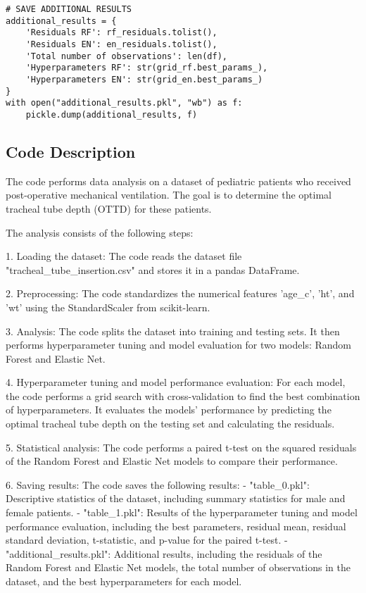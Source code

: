 \documentclass[11pt]{article}
\begin{document}
\begin{verbatim}
# SAVE ADDITIONAL RESULTS
additional_results = {
    'Residuals RF': rf_residuals.tolist(),
    'Residuals EN': en_residuals.tolist(),
    'Total number of observations': len(df),
    'Hyperparameters RF': str(grid_rf.best_params_),
    'Hyperparameters EN': str(grid_en.best_params_)
}
with open("additional_results.pkl", "wb") as f:
    pickle.dump(additional_results, f)

\end{verbatim}

\subsection{Code Description}

The code performs data analysis on a dataset of pediatric patients who received post-operative mechanical ventilation. The goal is to determine the optimal tracheal tube depth (OTTD) for these patients. 

The analysis consists of the following steps:

1. Loading the dataset: The code reads the dataset file "tracheal\_tube\_insertion.csv" and stores it in a pandas DataFrame.

2. Preprocessing: The code standardizes the numerical features 'age\_c', 'ht', and 'wt' using the StandardScaler from scikit-learn.

3. Analysis: The code splits the dataset into training and testing sets. It then performs hyperparameter tuning and model evaluation for two models: Random Forest and Elastic Net.

4. Hyperparameter tuning and model performance evaluation: For each model, the code performs a grid search with cross-validation to find the best combination of hyperparameters. It evaluates the models' performance by predicting the optimal tracheal tube depth on the testing set and calculating the residuals.

5. Statistical analysis: The code performs a paired t-test on the squared residuals of the Random Forest and Elastic Net models to compare their performance.

6. Saving results: The code saves the following results:
   - "table\_0.pkl": Descriptive statistics of the dataset, including summary statistics for male and female patients.
   - "table\_1.pkl": Results of the hyperparameter tuning and model performance evaluation, including the best parameters, residual mean, residual standard deviation, t-statistic, and p-value for the paired t-test.
   - "additional\_results.pkl": Additional results, including the residuals of the Random Forest and Elastic Net models, the total number of observations in the dataset, and the best hyperparameters for each model.
\end{document}
